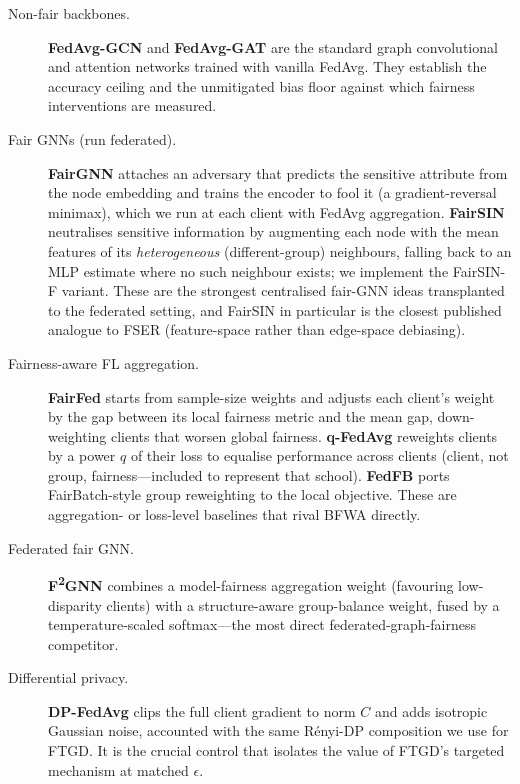 \documentclass[pdflatex,sn-mathphys-num]{sn-jnl}
\theoremstyle{thmstyleone}%
\theoremstyle{thmstyletwo}%
\theoremstyle{thmstylethree}%
\begin{document}
\begin{description}
\item[Non-fair backbones.] \textbf{FedAvg-GCN} and \textbf{FedAvg-GAT}
\cite{kipf2016semi,velickovic2017graph,mcmahan2017communication} are the
standard graph convolutional and attention networks trained with vanilla FedAvg.
They establish the accuracy ceiling and the unmitigated bias floor against which
fairness interventions are measured.

\item[Fair GNNs (run federated).] \textbf{FairGNN} \cite{dai2021say} attaches an
adversary that predicts the sensitive attribute from the node embedding and
trains the encoder to fool it (a gradient-reversal minimax), which we run at each
client with FedAvg aggregation. \textbf{FairSIN} \cite{yang2024fairsin}
neutralises sensitive information by augmenting each node with the mean features
of its \emph{heterogeneous} (different-group) neighbours, falling back to an MLP
estimate where no such neighbour exists; we implement the FairSIN-F variant.
These are the strongest centralised fair-GNN ideas transplanted to the federated
setting, and FairSIN in particular is the closest published analogue to FSER
(feature-space rather than edge-space debiasing).

\item[Fairness-aware FL aggregation.] \textbf{FairFed} \cite{ezzeldin2023fairfed}
starts from sample-size weights and adjusts each client's weight by the gap
between its local fairness metric and the mean gap, down-weighting clients that
worsen global fairness. \textbf{q-FedAvg} \cite{li2020fair} reweights clients by
a power $q$ of their loss to equalise performance across clients (client, not
group, fairness---included to represent that school). \textbf{FedFB} ports
FairBatch-style group reweighting to the local objective. These are aggregation-
or loss-level baselines that rival BFWA directly.

\item[Federated fair GNN.] \textbf{F\textsuperscript{2}GNN} \cite{f2gnn2023}
combines a model-fairness aggregation weight (favouring low-disparity clients)
with a structure-aware group-balance weight, fused by a temperature-scaled
softmax---the most direct federated-graph-fairness competitor.

\item[Differential privacy.] \textbf{DP-FedAvg} \cite{mcmahan2018learning} clips
the full client gradient to norm $C$ and adds isotropic Gaussian noise,
accounted with the same R\'enyi-DP composition we use for FTGD. It is the crucial
control that isolates the value of FTGD's targeted mechanism at matched
$\epsilon$.


\end{description}
\end{document}
